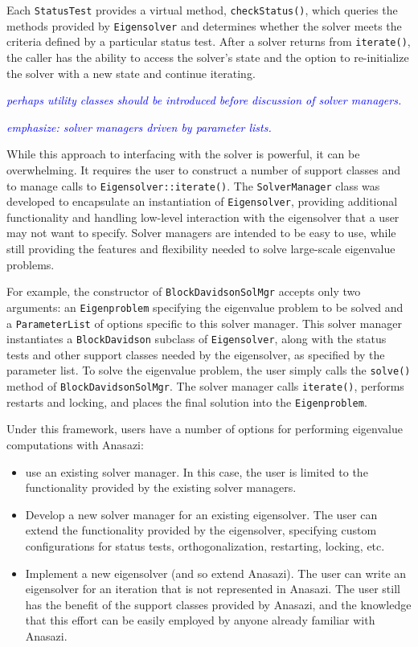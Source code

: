 \documentclass[acmtoms]{acmtrans2m}
\newcommand{\aspace}[1]{\texttt{#1}}
\newcommand{\cbcomm}[1]{\textcolor{blue}{\emph{#1}}}
\begin{document}
Each \aspace{StatusTest} provides a virtual method,
\verb!checkStatus()!, which queries the methods provided by
\aspace{Eigensolver} and determines whether the solver meets the
criteria defined by a particular status test. After a solver returns
from \verb!iterate()!, the caller has the ability to access the
solver's state and the option to re-initialize the solver with a new
state and continue iterating.

\cbcomm{perhaps utility classes should be introduced before discussion
of solver managers.}

\cbcomm{emphasize: solver managers driven by parameter lists.}

While this approach to interfacing with the solver is powerful, it can be overwhelming. It
requires the user to construct a number of support classes and to manage calls to
\verb!Eigensolver::iterate()!. The \aspace{SolverManager} class was developed to
encapsulate an instantiation of \aspace{Eigensolver}, providing additional functionality
and handling low-level interaction with the eigensolver that a user may not want to
specify. Solver managers are intended to be easy to use, while still providing the
features and flexibility needed to solve large-scale eigenvalue problems.

For example, the constructor of \aspace{BlockDavidsonSolMgr} accepts only two arguments:
an \aspace{Eigenproblem} specifying the eigenvalue problem to be solved and a
\texttt{ParameterList} of options specific to this solver manager. This solver manager
instantiates a \aspace{BlockDavidson} subclass of \aspace{Eigensolver}, along with the
status tests and other support classes needed by the eigensolver, as
specified by the parameter list. To solve the eigenvalue
problem, the user simply calls the \verb!solve()! method of \aspace{BlockDavidsonSolMgr}.
The solver manager calls \verb!iterate()!, performs restarts and locking, and places the
final solution into the \aspace{Eigenproblem}.

Under this framework, users have a number of options for performing eigenvalue
computations with Anasazi:
\begin{itemize}
\item
use an existing solver manager. In this case, the user is limited to
the functionality provided by the existing solver managers.
\item
Develop a new solver manager for an existing eigensolver.
The user can extend the functionality provided by the eigensolver,
specifying custom configurations for status tests,
orthogonalization, restarting, locking,  etc.
\item
Implement a new eigensolver (and so extend Anasazi). The user can
write an eigensolver for an iteration that is not represented in
Anasazi. The user still has the benefit of the support classes
provided by Anasazi, and the knowledge that this effort can be
easily employed by anyone already familiar with Anasazi.
\end{itemize}
\end{document}
